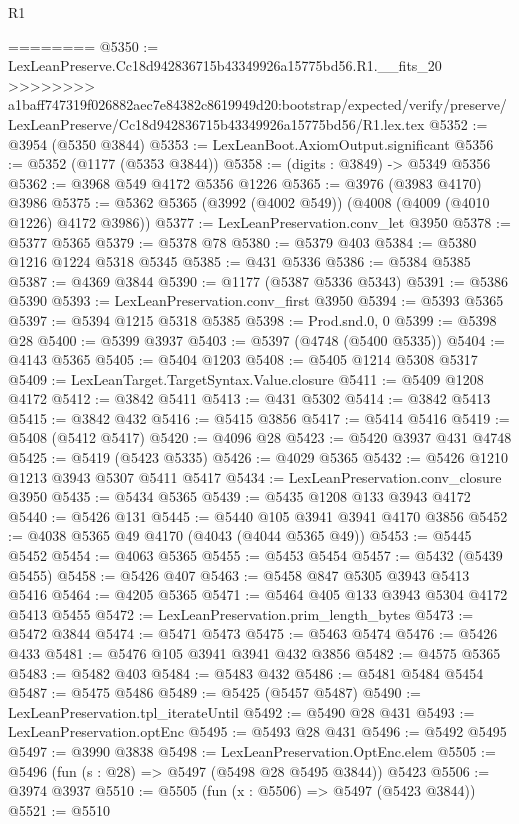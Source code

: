\begin{lexlean}{R1}
\begin{coremodule}
{{{{{{{{{{{{{{{{{{{{{{{{{{{{{{{{{{{{{{{{{{{{{{{{{{{{{{{{{{{{{{{{{{{{{{{{{{{{{{{{{{{{{{{{{{{{{{{{{{{{{{{{{{{{{{{{{{{{{{{{{{{{{{{{{{{{{{{{{{{{{{{{{{{{{{{{{{{{{{{{{{{{{{{{{{{{{{{{{{{{{{{{{{========
@5350 := LexLeanPreserve.Cc18d942836715b43349926a15775bd56.R1.__fits_20
>>>>>>>> a1baff747319f026882aec7e84382c8619949d20:bootstrap/expected/verify/preserve/LexLeanPreserve/Cc18d942836715b43349926a15775bd56/R1.lex.tex
@5352 := @3954 (@5350 @3844)
@5353 := LexLeanBoot.AxiomOutput.significant
@5356 := @5352 (@1177 (@5353 @3844))
@5358 := (digits : @3849) -> @5349 @5356
@5362 := @3968 @549 @4172 @5356 @1226
@5365 := @3976 (@3983 @4170) @3986
@5375 := @5362 @5365 (@3992 (@4002 @549)) (@4008 (@4009 (@4010 @1226) @4172 @3986))
@5377 := LexLeanPreservation.conv_let @3950
@5378 := @5377 @5365
@5379 := @5378 @78
@5380 := @5379 @403
@5384 := @5380 @1216 @1224 @5318 @5345
@5385 := @431 @5336
@5386 := @5384 @5385
@5387 := @4369 @3844
@5390 := @1177 (@5387 @5336 @5343)
@5391 := @5386 @5390
@5393 := LexLeanPreservation.conv_first @3950
@5394 := @5393 @5365
@5397 := @5394 @1215 @5318 @5385
@5398 := Prod.snd.{0, 0}
@5399 := @5398 @28
@5400 := @5399 @3937
@5403 := @5397 (@4748 (@5400 @5335))
@5404 := @4143 @5365
@5405 := @5404 @1203
@5408 := @5405 @1214 @5308 @5317
@5409 := LexLeanTarget.TargetSyntax.Value.closure
@5411 := @5409 @1208 @4172
@5412 := @3842 @5411
@5413 := @431 @5302
@5414 := @3842 @5413
@5415 := @3842 @432
@5416 := @5415 @3856
@5417 := @5414 @5416
@5419 := @5408 (@5412 @5417)
@5420 := @4096 @28
@5423 := @5420 @3937 @431 @4748
@5425 := @5419 (@5423 @5335)
@5426 := @4029 @5365
@5432 := @5426 @1210 @1213 @3943 @5307 @5411 @5417
@5434 := LexLeanPreservation.conv_closure @3950
@5435 := @5434 @5365
@5439 := @5435 @1208 @133 @3943 @4172
@5440 := @5426 @131
@5445 := @5440 @105 @3941 @3941 @4170 @3856
@5452 := @4038 @5365 @49 @4170 (@4043 (@4044 @5365 @49))
@5453 := @5445 @5452
@5454 := @4063 @5365
@5455 := @5453 @5454
@5457 := @5432 (@5439 @5455)
@5458 := @5426 @407
@5463 := @5458 @847 @5305 @3943 @5413 @5416
@5464 := @4205 @5365
@5471 := @5464 @405 @133 @3943 @5304 @4172 @5413 @5455
@5472 := LexLeanPreservation.prim_length_bytes
@5473 := @5472 @3844
@5474 := @5471 @5473
@5475 := @5463 @5474
@5476 := @5426 @433
@5481 := @5476 @105 @3941 @3941 @432 @3856
@5482 := @4575 @5365
@5483 := @5482 @403
@5484 := @5483 @432
@5486 := @5481 @5484 @5454
@5487 := @5475 @5486
@5489 := @5425 (@5457 @5487)
@5490 := LexLeanPreservation.tpl_iterateUntil
@5492 := @5490 @28 @431
@5493 := LexLeanPreservation.optEnc
@5495 := @5493 @28 @431
@5496 := @5492 @5495
@5497 := @3990 @3838
@5498 := LexLeanPreservation.OptEnc.elem
@5505 := @5496 (fun (s : @28) => @5497 (@5498 @28 @5495 @3844)) @5423
@5506 := @3974 @3937
@5510 := @5505 (fun (x : @5506) => @5497 (@5423 @3844))
@5521 := @5510
}}}}}}}}}}}}}}}}}}}}}}}}}}}}}}}}}}}}}}}}}}}}}}}}}}}}}}}}}}}}}}}}}}}}}}}}}}}}}}}}}}}}}}}}}}}}}}}}}}}}}}}}}}}}}}}}}}}}}}}}}}}}}}}}}}}}}}}}}}}}}}}}}}}}}}}}}}}}}}}}}}}}}}}}}}}}}}}}}}}}}}}}}}
\end{coremodule}
\end{lexlean}
